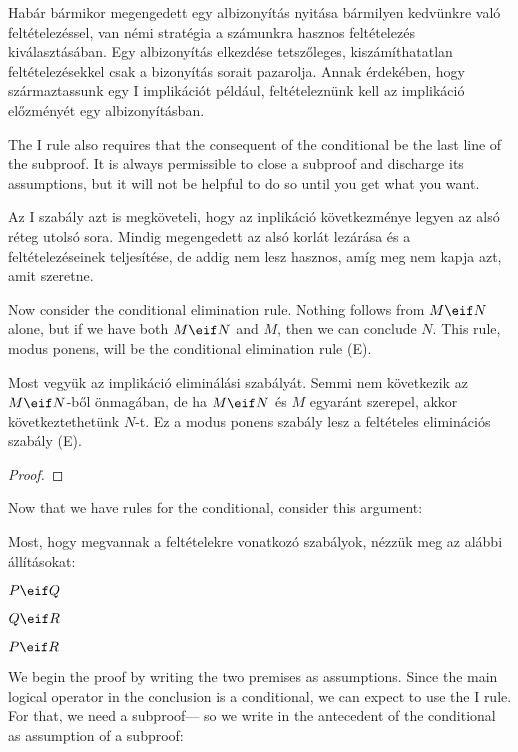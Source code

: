 Habár bármikor megengedett egy albizonyítás nyitása bármilyen kedvünkre való feltételezéssel, van némi stratégia a számunkra hasznos feltételezés kiválasztásában. Egy albizonyítás elkezdése tetszőleges, kiszámíthatatlan feltételezésekkel csak a bizonyítás sorait pazarolja. Annak érdekében, hogy származtassunk egy {\eif}I implikációt például, feltételeznünk kell az implikáció előzményét egy albizonyításban.



The {\eif}I rule also requires that the consequent of the conditional be the last line of the subproof. It is always permissible to close a subproof and discharge its assumptions, but it will not be helpful to do so until you get what you want.

Az {\eif}I szabály azt is megköveteli, hogy az inplikáció következménye legyen az alsó réteg utolsó sora. Mindig megengedett az alsó korlát lezárása és a feltételezéseinek teljesítése, de addig nem lesz hasznos, amíg meg nem kapja azt, amit szeretne.

Now consider the conditional elimination rule. Nothing follows from $M\eif N$ alone, but if we have both $M \eif N$ and $M$, then we can conclude $N$. This rule, modus ponens, will be the conditional elimination rule ({\eif}E).

Most vegyük az implikáció eliminálási szabályát. Semmi nem következik az $M\eif N$-ből önmagában, de ha $M \eif N$ és $M$ egyaránt szerepel, akkor következtethetünk $N$-t. Ez a modus ponens szabály lesz a feltételes eliminációs szabály ({\eif}E).

\begin{proof}
	 
\end{proof}

Now that we have rules for the conditional, consider this argument:

Most, hogy megvannak a feltételekre vonatkozó szabályok, nézzük meg az alábbi állításokat:

\label{proofHS}
\begin{earg}
\item[] $P \eif Q$
\item[] $Q \eif R$
\item[\therefore] $P \eif R$
\end{earg}
We begin the proof by writing the two premises as assumptions. Since the main logical operator in the conclusion is a conditional, we can expect to use the {\eif}I rule. For that, we need a subproof--- so we write in the antecedent of the conditional as assumption of a subproof:

